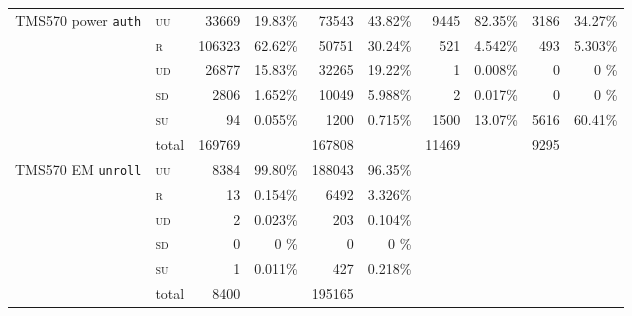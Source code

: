 \documentclass[10pt]{article}
\newcommand{\TI}{TMS570\xspace}
\newcommand{\unroll}{\texttt{unroll}\xspace}
\newcommand{\auth}{\texttt{auth}\xspace}
\newcommand{\UU}{\textsc{uu}\xspace}
\newcommand{\UD}{\textsc{ud}\xspace}
\newcommand{\SU}{\textsc{su}\xspace}
\newcommand{\SD}{\textsc{sd}\xspace}
\newcommand{\R}{\textsc{r}\xspace}
\begin{document}
\begin{table}[H]
\begin{tabular}{ll rr rr rr rr}
    \multicolumn{1}{c}{\multirow{3}{*}{ \parbox{2cm}{\TI power \auth}}}
    & \UU    
    & 33669   & 19.83\%                     
    &  73543  & 43.82\%                 
    &  9445  & 82.35\%                 
    &  3186  & 34.27\%                      
    \\
    & \R   
    & 106323  & 62.62\%                     
    &  50751  & 30.24\%                 
    &  521   & 4.542\%                 
    &  493   & 5.303\%                      
    \\
    & \UD  
    & 26877   & 15.83\%                     
    &  32265  & 19.22\%                 
    &  1     & 0.008\%                 
    &  0     & 0    \%                      
    \\
    & \SD     
    & 2806    & 1.652\%                     
    &  10049  & 5.988\%                 
    &  2     & 0.017\%                 
    &  0     & 0    \%                      
    \\
    & \SU      
    & 94      & 0.055\%                     
    &  1200   & 0.715\%                 
    &  1500  & 13.07\%                 
    &  5616  & 60.41\%                      
    \\

    & total    
    & 169769  &                           
    &  167808 &                       
    &  11469 &                       
    & 9295  &                                 
    \\

    \midrule

    \multicolumn{1}{c}{\multirow{3}{*}{ \parbox{2cm}{\TI EM \unroll}}}

    & \UU    
    & 8384   & 99.80\%                   
    &  188043 & 96.35\%    
    & & 
    & &
    \\
    & \R   
    & 13     & 0.154\%                   
    &  6492   & 3.326\%    
    & & 
    & &
    \\
    & \UD  
    & 2      & 0.023\%                   
    &  203    & 0.104\%    
    & & 
    & &
    \\
    & \SD     
    & 0      & 0    \%                   
    &  0      &  0    \%   
    & & 
    & &
    \\
    & \SU      
    & 1      & 0.011\%                   
    &  427    & 0.218\%    
    & & 
    & &
    \\

    & total    
    & 8400   &                            
    &  195165 &             
    & & 
    & &
    \\   


\end{tabular}
\end{table}
\end{document}

